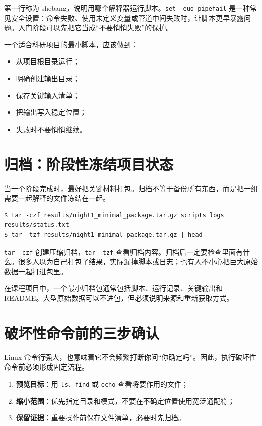 第一行称为 shebang，说明用哪个解释器运行脚本。\texttt{set -euo pipefail} 是一种常见安全设置：命令失败、使用未定义变量或管道中间失败时，让脚本更早暴露问题。入门阶段可以先把它当成“不要悄悄失败”的保护。

一个适合科研项目的最小脚本，应该做到：

\begin{itemize}
    \item 从项目根目录运行；
    \item 明确创建输出目录；
    \item 保存关键输入清单；
    \item 把输出写入稳定位置；
    \item 失败时不要悄悄继续。
\end{itemize}

\section{归档：阶段性冻结项目状态}

当一个阶段完成时，最好把关键材料打包。归档不等于备份所有东西，而是把一组需要一起解释的文件冻结在一起。

\begin{examplebox}[创建和检查归档]
\begin{lstlisting}[style=terminal]
$ tar -czf results/night1_minimal_package.tar.gz scripts logs results/status.txt
$ tar -tzf results/night1_minimal_package.tar.gz | head
\end{lstlisting}
\end{examplebox}

\texttt{tar -czf} 创建压缩归档，\texttt{tar -tzf} 查看归档内容。归档后一定要检查里面有什么。很多人以为自己打包了结果，实际漏掉脚本或日志；也有人不小心把巨大原始数据一起打进包里。

在课程项目中，一个最小归档包通常包括脚本、运行记录、关键输出和 README。大型原始数据可以不进包，但必须说明来源和重新获取方式。

\section{破坏性命令前的三步确认}

Linux 命令行强大，也意味着它不会频繁打断你问“你确定吗”。因此，执行破坏性命令前必须形成固定流程。

\begin{enumerate}
    \item \textbf{预览目标}：用 \texttt{ls}、\texttt{find} 或 \texttt{echo} 查看将要作用的文件；
    \item \textbf{缩小范围}：优先指定目录和模式，不要在不确定位置使用宽泛通配符；
    \item \textbf{保留证据}：重要操作前保存文件清单，必要时先归档。
\end{enumerate}

